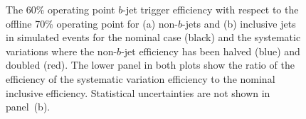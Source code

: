 \begin{figure}[!ht]
  \begin{center}
    \captionsetup[subfigure]{aboveskip=0pt,justification=centering}
  \end{center}
\vspace{-1em}
  \caption[The $b$-jet trigger efficiency for  non-$b$-jets and inclusive jets for systematic variations of the non-$b$-jet efficiency.]
          {The 60\% operating point $b$-jet trigger efficiency with respect to the offline 70\% operating point
            for (a) non-$b$-jets and (b) inclusive jets in simulated events
            for the  nominal case (black) and the systematic variations where the non-$b$-jet efficiency has been halved (blue) and doubled (red).
            The lower panel in both plots show the ratio of the efficiency of the systematic variation efficiency to the nominal inclusive efficiency.
            Statistical uncertainties are not shown in panel~(b).
  }
  \label{fig:Eff_LTrigEff}
\end{figure}


